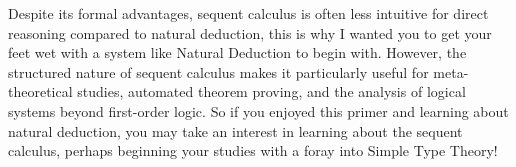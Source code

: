 Despite its formal advantages, sequent calculus is often less intuitive for direct reasoning compared to natural deduction, this is why I wanted you to get your feet wet with a system like 
Natural Deduction to begin with. However, the structured nature of sequent calculus makes it particularly useful for meta-theoretical studies, automated theorem proving, and the analysis 
of logical systems beyond first-order logic. So if you enjoyed this primer and learning about natural deduction, you may take an interest in learning about the sequent calculus, perhaps beginning 
your studies with a foray into Simple Type Theory!




